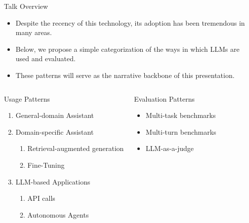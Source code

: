 \documentclass[handout]{beamer}
\begin{document}
\begin{frame}{Talk Overview}
\begin{scriptsize}
\begin{itemize}
 \item Despite the recency of this technology, its adoption has been tremendous in many areas. 
 \item Below, we propose a simple categorization of the ways in which LLMs are used and evaluated.
  \item These patterns will serve as the narrative backbone of this presentation.
\end{itemize}



\begin{columns}[t]
\begin{block}{Usage Patterns}
\begin{enumerate}
\item General-domain Assistant
\item Domain-specific Assistant
\begin{enumerate}\scriptsize
\item Retrieval-augmented generation
\item Fine-Tuning
\end{enumerate}
\item LLM-based Applications
\begin{enumerate}\scriptsize
\item API calls
\item Autonomous Agents
\end{enumerate}
\end{enumerate}
\end{block}

\begin{block}{Evaluation Patterns}
\begin{itemize}
\item Multi-task benchmarks
\item Multi-turn benchmarks
\item LLM-as-a-judge
\end{itemize}
\end{block}

\end{columns}

\end{scriptsize}
\end{frame}
\end{document}
